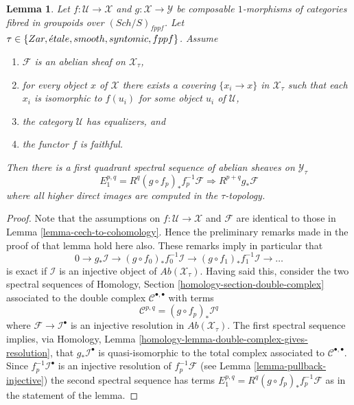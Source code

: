 \documentclass{stacks-project}
\theoremstyle{plain}
\newtheorem{lemma}[subsection]{Lemma}
\theoremstyle{definition}
\theoremstyle{remark}
\numberwithin{equation}{subsection}
\def\Sch{\mathit{Sch}}
\def\etale{{\acute{e}tale}}
\begin{document}
\begin{lemma}
\label{lemma-cech-to-cohomology-relative}
Let $f : \mathcal{U} \to \mathcal{X}$ and
$g : \mathcal{X} \to \mathcal{Y}$
be composable $1$-morphisms of categories fibred
in groupoids over $(\Sch/S)_{fppf}$. Let
$\tau \in \{Zar, \etale, smooth, syntomic, \linebreak[0] fppf\}$.
Assume
\begin{enumerate}
\item $\mathcal{F}$ is an abelian sheaf on $\mathcal{X}_\tau$,
\item for every object $x$ of $\mathcal{X}$ there exists a covering
$\{x_i \to x\}$ in $\mathcal{X}_\tau$ such that each $x_i$ is isomorphic
to $f(u_i)$ for some object $u_i$ of $\mathcal{U}$,
\item the category $\mathcal{U}$ has equalizers, and
\item the functor $f$ is faithful.
\end{enumerate}
Then there is a first quadrant spectral sequence of abelian sheaves
on $\mathcal{Y}_\tau$
$$
E_1^{p, q} = R^q(g \circ f_p)_*f_p^{-1}\mathcal{F}
\Rightarrow
R^{p + q}g_*\mathcal{F}
$$
where all higher direct images are computed in the $\tau$-topology.
\end{lemma}

\begin{proof}
Note that the assumptions on $f : \mathcal{U} \to \mathcal{X}$
and $\mathcal{F}$ are identical to those in
Lemma \ref{lemma-cech-to-cohomology}.
Hence the preliminary remarks made in the proof of that lemma
hold here also. These remarks imply in particular that
$$
0 \to g_*\mathcal{I} \to
(g \circ f_0)_*f_0^{-1}\mathcal{I} \to
(g \circ f_1)_*f_1^{-1}\mathcal{I} \to \ldots
$$
is exact if $\mathcal{I}$ is an injective object of
$\textit{Ab}(\mathcal{X}_\tau)$.
Having said this, consider the two spectral sequences of
Homology, Section \ref{homology-section-double-complex}
associated to the double complex $\mathcal{C}^{\bullet, \bullet}$ with terms
$$
\mathcal{C}^{p, q} = (g \circ f_p)_*\mathcal{I}^q
$$
where $\mathcal{F} \to \mathcal{I}^\bullet$ is an injective resolution
in $\textit{Ab}(\mathcal{X}_\tau)$. The first spectral sequence implies, via
Homology, Lemma \ref{homology-lemma-double-complex-gives-resolution},
that $g_*\mathcal{I}^\bullet$ is quasi-isomorphic to the total complex
associated to $\mathcal{C}^{\bullet, \bullet}$.
Since $f_p^{-1}\mathcal{I}^\bullet$ is an injective resolution of
$f_p^{-1}\mathcal{F}$ (see
Lemma \ref{lemma-pullback-injective})
the second spectral sequence has terms
$E_1^{p, q} = R^q(g \circ f_p)_*f_p^{-1}\mathcal{F}$ as in the statement
of the lemma.
\end{proof}
\end{document}
